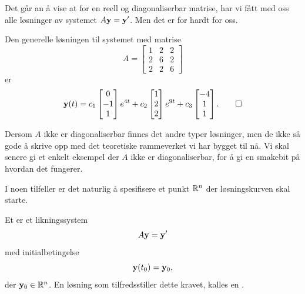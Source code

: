 \begin{kommentarx}
Det går an å vise at for en reell og diagonaliserbar matrise, har vi fått med oss alle løsninger av systemet $A\mathbf{y}=\mathbf{y}'$. Men det er for hardt for oss.
\end{kommentarx}


\begin{ex}
Den generelle løsningen til systemet med matrise
\[
A=
\begin{bmatrix}
1 & 2 & 2\\  2 &6 & 2 \\ 2 & 2 & 6
\end{bmatrix}
\]
er
\[
\mathbf{y}(t)=
c_1
\begin{bmatrix}
0 \\ -1 \\ 1
\end{bmatrix} e^{4t}
+
c_2
\begin{bmatrix}
1 \\ 2 \\ 2
\end{bmatrix}e^{9t}
+
c_3
\begin{bmatrix}
-4 \\ 1 \\ 1
\end{bmatrix}. \qedhere
\]
\end{ex}

\begin{kommentarx}
Dersom $A$ ikke er diagonaliserbar finnes det andre typer løsninger, 
men de ikke så gode å skrive opp med det teoretiske rammeverket vi har bygget til nå. 
Vi skal senere gi et enkelt eksempel der $A$ ikke er diagonaliserbar, for å gi en smakebit på hvordan det fungerer.
\end{kommentarx}


I noen tilfeller er det naturlig å spesifisere et punkt $\mathbb{R}^n$ der løsningskurven skal starte. 

\begin{defnx}
Et  er et likningssystem
\[
A\mathbf{y}=\mathbf{y}'
\]
med initialbetingelse
\[
\mathbf{y}(t_0)=\mathbf{y}_0,
\]
der $\mathbf{y}_0 \in \mathbb{R}^n$. En løsning som tilfredsstiller dette kravet, kalles en .
\end{defnx}


